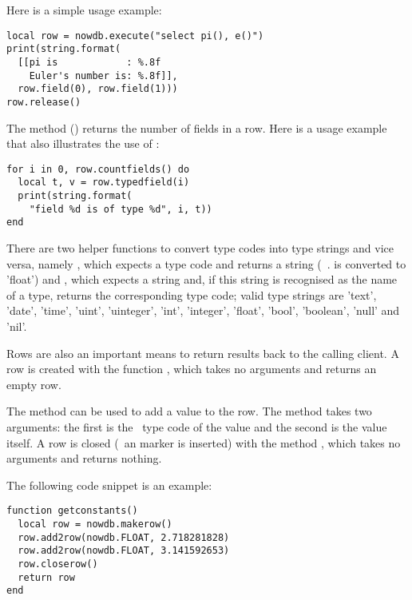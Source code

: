 Here is a simple usage example:

\begin{lua}
\begin{lstlisting}
local row = nowdb.execute("select pi(), e()")
print(string.format(
  [[pi is            : %.8f
    Euler's number is: %.8f]],
  row.field(0), row.field(1)))
row.release()
\end{lstlisting}
\end{lua}

\clearpage
The method () returns
the number of fields in a row.
Here is a usage example that also
illustrates the use of :

\begin{lua}
\begin{lstlisting}
for i in 0, row.countfields() do
  local t, v = row.typedfield(i)
  print(string.format(
    "field %d is of type %d", i, t))
end
\end{lstlisting}
\end{lua}

There are two helper functions to convert
type codes into type strings and vice versa,
namely ,
which expects a type code and returns a string
(\eg\ .  is converted
to 'float') and
, which expects
a string and, if this string is recognised
as the name of a type, returns the corresponding
type code; valid type strings are
'text', 'date', 'time', 'uint', 'uinteger',
'int', 'integer', 'float', 'bool', 'boolean',
'null' and 'nil'.

Rows are also an important means to return 
results back to the calling client.
A row is created with the function
, which takes
no arguments and returns an empty row.

The method  can
be used to add a value to the row.
The method takes two arguments:
the first is the \nowdb\ type code of the value
and the second is the value itself.
A row is closed (\ie\ an  marker
is inserted) with the method
, which takes no arguments
and returns nothing.

The following code snippet is an example:

\begin{lua}
\begin{lstlisting}
function getconstants()
  local row = nowdb.makerow()
  row.add2row(nowdb.FLOAT, 2.718281828)
  row.add2row(nowdb.FLOAT, 3.141592653)
  row.closerow()
  return row
end
\end{lstlisting}
\end{lua}

